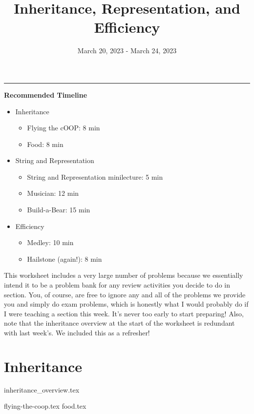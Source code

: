 \documentclass{exam}
\title{Inheritance, Representation, and Efficiency}
\date{March 20, 2023 - March 24, 2023}
\begin{document}
\maketitle
\rule{\textwidth}{0.15em}

\begin{meta}
    \textbf{Recommended Timeline}
    \begin{itemize}
        \item Inheritance
        \begin{itemize}
            \item Flying the cOOP: 8 min
            \item Food: 8 min
        \end{itemize}
        \item String and Representation
        \begin{itemize}
            \item String and Representation minilecture: 5 min
            \item Musician: 12 min
            \item Build-a-Bear: 15 min
        \end{itemize}
        \item Efficiency
        \begin{itemize}
            \item Medley: 10 min
            \item Hailstone (again!): 8 min
        \end{itemize}
    \end{itemize}
    This worksheet includes a very large number of problems because we essentially intend it to be a problem bank for any review activities you decide to do in section. You, of course, are free to ignore any and all of the problems we provide you and simply do exam problems, which is honestly what I would probably do if I were teaching a section this week. It's never too early to start preparing!
    \newline Also, note that the inheritance overview at the start of the worksheet is redundant with last week's. We included this as a refresher!
\end{meta}

\section{Inheritance}
{inheritance_overview.tex}
\begin{questions}
    {flying-the-coop.tex}
    {food.tex}
    \newpage
\end{questions}
\end{document}
